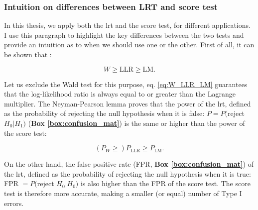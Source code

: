 \newpage

\subsubsection{Intuition on differences between LRT and score test}

In this thesis, we apply both the \gls{lrt} and the score test, for different applications.
I use this paragraph to highlight the key differences between the two tests and provide an intuition as to when we should use one or the other.
First of all, it can be shown that \cite{engle1984wald}:

\begin{equation}\label{eq:W_LLR_LM}
    W \geq \mathrm{LLR} \geq \mathrm{LM}.
\end{equation}

Let us exclude the Wald test for this purpose, eq. \eqref{eq:W_LLR_LM} guarantees that the log-likelihood ratio is always equal to or greater than the Lagrange multiplier.
The Neyman-Pearson lemma \cite{neyman1933ix} proves that the power  of the \gls{lrt}, defined as the probability of rejecting the null hypothesis when it is false: $P = P($reject $H_0 | H_1)$ (\textbf{Box \ref{box:confusion_mat}}) is the same or higher than the power of the score test:

\begin{equation}
    (P_W \geq) P_{\mathrm{LLR}} \geq P_{\mathrm{LM}}.
\end{equation}

On the other hand, the false positive rate (FPR, \textbf{Box \ref{box:confusion_mat}}) of the \gls{lrt}, defined as the probability of rejecting the null hypothesis when it is true: FPR $= P($reject $H_0 | H_0)$ is also higher than the FPR of the score test.
The score test is therefore more accurate, making a smaller (or equal) number of Type I errors. \\

